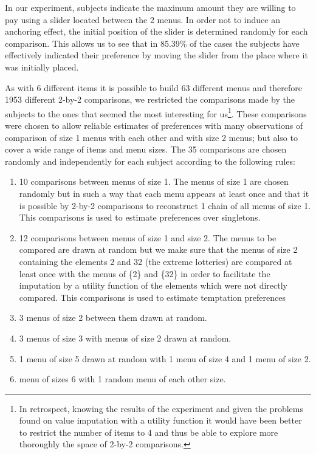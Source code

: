 \documentclass[
]{book}
\providecommand{\tightlist}{%
  \setlength{\itemsep}{0pt}\setlength{\parskip}{0pt}}
\begin{document}
In our experiment, subjects indicate the maximum amount they are willing to pay
using a slider located between the 2 menus.
In order not to induce an anchoring effect, the initial position of the slider
is determined randomly for each comparison.
This allows us to see that in 85.39\% of the
cases the subjects have effectively indicated their preference by moving the
slider from the place where it was initially placed.

As with 6 different items it is possible to build 63 different menus and
therefore 1953 different 2-by-2 comparisons, we restricted the comparisons made
by the subjects to the ones that seemed the most interesting for us\footnote{In retrospect, knowing the results of the experiment and given the problems found on value
  imputation with a utility function it would have been better to restrict the
  number of items to 4 and thus be able to explore more thoroughly the space of 2-by-2 comparisons.}.
These comparisons were chosen to allow reliable estimates of preferences with many
observations of comparison of size 1 menus with each other and with size 2
menus;
but also to cover a wide range of items and menu sizes.
The 35 comparisons are chosen randomly and independently for each subject
according to the following rules:

\begin{enumerate}
\def\labelenumi{\arabic{enumi}.}
\tightlist
\item
  10 comparisons between menus of size 1.
  The menus of size 1 are chosen randomly but in such a way that each menu appears
  at least once and that it is possible by 2-by-2 comparisons to reconstruct 1
  chain of all menus of size 1.
  This comparisons is used to estimate preferences over singletons.
\item
  12 comparisons between menus of size 1 and size 2.
  The menus to be compared are drawn at random but we make sure that the menus of
  size 2 containing the elements 2 and 32 (the extreme lotteries) are compared at
  least once with the menus of \{2\} and \{32\} in order to facilitate the imputation
  by a utility function of the elements which were not directly compared.
  This comparisons is used to estimate temptation preferences
\item
  3 menus of size 2 between them drawn at random.
\item
  3 menus of size 3 with menus of size 2 drawn at random.
\item
  1 menu of size 5 drawn at random with 1 menu of size 4 and 1 menu of size 2.
\item
  menu of sizes 6 with 1 random menu of each other size.
\end{enumerate}
\end{document}
